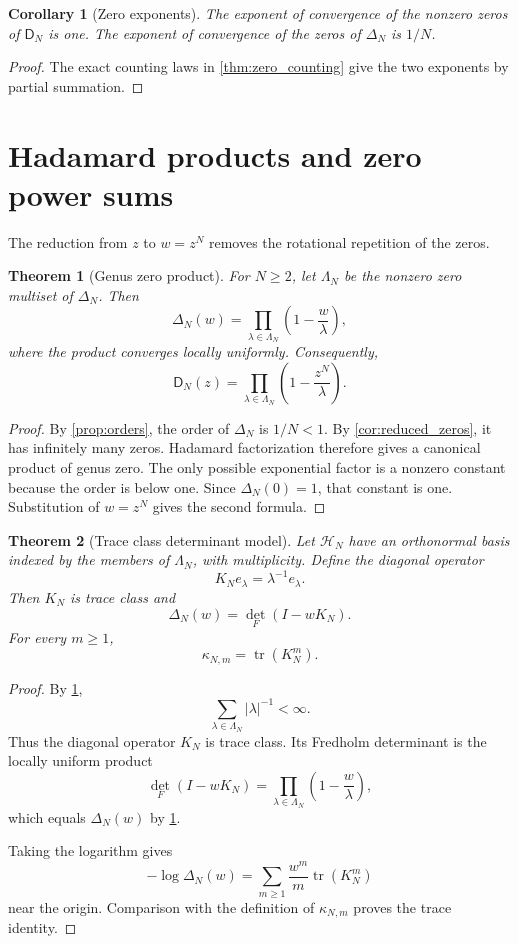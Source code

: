 \documentclass{aomart}
\newtheorem{theorem}{Theorem}[section]
\newtheorem{corollary}[corollary]{Corollary}
\theoremstyle{definition}
\theoremstyle{remark}
\newcommand{\Dfun}{\mathsf D}
\newcommand{\tr}{\operatorname{tr}}
\newcommand{\Fdet}{\operatorname{det}_{\!F}}
\begin{document}
\begin{corollary}[Zero exponents]\label{cor:exponent_of_convergence}
The exponent of convergence of the nonzero zeros of $\Dfun_N$ is one.  The exponent of convergence of the zeros of $\Delta_N$ is $1/N$.
\end{corollary}

\begin{proof}
The exact counting laws in \cref{thm:zero_counting} give the two exponents by partial summation.
\end{proof}

\section{Hadamard products and zero power sums}\label{sec:hadamard}

The reduction from $z$ to $w=z^N$ removes the rotational repetition of the zeros.

\begin{theorem}[Genus zero product]\label{thm:genus_zero_product}
For $N\geq2$, let $\Lambda_N$ be the nonzero zero multiset of $\Delta_N$.  Then
\[
\Delta_N(w)
=
\prod_{\lambda\in\Lambda_N}
\left(1-\frac w\lambda\right),
\]
where the product converges locally uniformly.  Consequently,
\[
\Dfun_N(z)
=
\prod_{\lambda\in\Lambda_N}
\left(1-\frac{z^N}{\lambda}\right).
\]
\end{theorem}

\begin{proof}
By \cref{prop:orders}, the order of $\Delta_N$ is $1/N<1$.  By \cref{cor:reduced_zeros}, it has infinitely many zeros.  Hadamard factorization therefore gives a canonical product of genus zero.  The only possible exponential factor is a nonzero constant because the order is below one.  Since $\Delta_N(0)=1$, that constant is one.  Substitution of $w=z^N$ gives the second formula.
\end{proof}


\begin{theorem}[Trace class determinant model]\label{thm:trace_class_model}
Let $\mathcal H_N$ have an orthonormal basis indexed by the members of $\Lambda_N$, with multiplicity.  Define the diagonal operator
\[
K_Ne_\lambda=\lambda^{-1}e_\lambda.
\]
Then $K_N$ is trace class and
\[
\Delta_N(w)=\Fdet(I-wK_N).
\]
For every $m\geq1$,
\[
\kappa_{N,m}=\tr(K_N^m).
\]
\end{theorem}

\begin{proof}
By \cref{cor:exponent_of_convergence},
\[
\sum_{\lambda\in\Lambda_N}|\lambda|^{-1}<\infty.
\]
Thus the diagonal operator $K_N$ is trace class.  Its Fredholm determinant is the locally uniform product
\[
\Fdet(I-wK_N)
=
\prod_{\lambda\in\Lambda_N}
\left(1-\frac w\lambda\right),
\]
which equals $\Delta_N(w)$ by \cref{thm:genus_zero_product}.

Taking the logarithm gives
\[
-\log\Delta_N(w)
=
\sum_{m\geq1}\frac{w^m}{m}\tr(K_N^m)
\]
near the origin.  Comparison with the definition of $\kappa_{N,m}$ proves the trace identity.
\end{proof}
\end{document}

